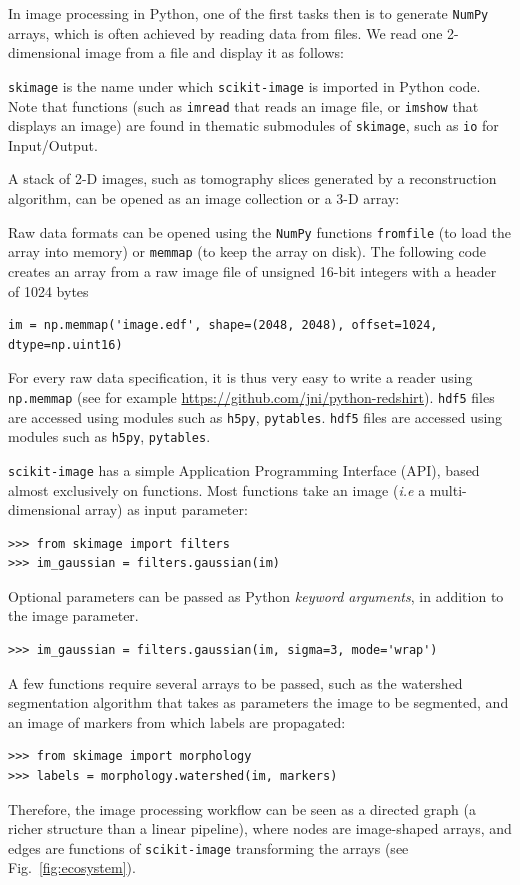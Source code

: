 \documentclass[twocolumn]{bmcart}%
\begin{document}
In image processing in Python, one of the first tasks then is to generate
\texttt{NumPy} arrays, which is often achieved by reading data from files. We
read one 2-dimensional image from a file and display it as follows:

 

\texttt{skimage} is the name under which \texttt{scikit-image} is imported in
Python code. Note that functions (such as \texttt{imread} that reads an image
file, or \texttt{imshow} that displays an image) are found in thematic submodules of
\texttt{skimage}, such as \texttt{io} for Input/Output.

A stack of 2-D images, such as tomography slices generated by a reconstruction algorithm, can be opened as an image collection or a 3-D array:

Raw data formats can be opened using the \texttt{NumPy} functions
\texttt{fromfile} (to load the array into memory) or \texttt{memmap} (to
keep the array on disk). The following code creates an array from a
raw image file of unsigned 16-bit integers with a header of 1024 bytes 
\begin{lstlisting}
im = np.memmap('image.edf', shape=(2048, 2048), offset=1024, dtype=np.uint16)
\end{lstlisting}
For every raw data specification, it is thus very easy to write a reader
using \texttt{np.memmap} (see for example
\url{https://github.com/jni/python-redshirt}). 
\texttt{hdf5} files are accessed using modules such as \texttt{h5py}, \texttt{pytables}.
\texttt{hdf5} files are accessed using modules such as \texttt{h5py}, \texttt{pytables}.

\texttt{scikit-image} has a simple Application Programming Interface
(API), based almost exclusively on
functions. Most functions take an image (\emph{i.e} a multi-dimensional
array) as input parameter:
\begin{lstlisting}
>>> from skimage import filters
>>> im_gaussian = filters.gaussian(im)
\end{lstlisting}

Optional parameters can be passed as Python \emph{keyword arguments},
in addition to the image parameter.
\begin{lstlisting}
>>> im_gaussian = filters.gaussian(im, sigma=3, mode='wrap')
\end{lstlisting}
A few functions require several arrays to be passed, such as the
watershed segmentation algorithm that takes as parameters the image to be
segmented, and an image of markers from which labels are propagated:
\begin{lstlisting}
>>> from skimage import morphology
>>> labels = morphology.watershed(im, markers)
\end{lstlisting}
Therefore, the image processing workflow can be seen as a directed graph
(a richer structure than a linear pipeline), where nodes are image-shaped arrays, and
edges are functions of \texttt{scikit-image} transforming the arrays (see
Fig.~\ref{fig:ecosystem}).
\end{document}
